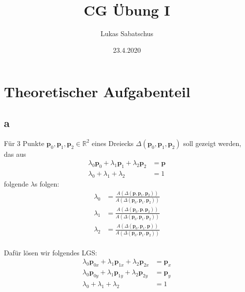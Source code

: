 \documentclass[fontsize=10pt,a4paper]{scrartcl}
\title{CG Übung I}
\author{Lukas Sabatschus}
\date{23.4.2020}
\begin{document}
\maketitle

\section{Theoretischer Aufgabenteil}
\subsection{a}
Für 3 Punkte $\mathbf{p}_0,\mathbf{p}_1,\mathbf{p}_2\in \mathbb{R}^2$
eines Dreiecks $\Delta(\mathbf{p}_0,\mathbf{p}_1,\mathbf{p}_2)$
soll gezeigt werden, das aus
\begin{align*}
	\lambda_0\mathbf{p}_0+\lambda_1\mathbf{p}_1+\lambda_2\mathbf{p}_2&=\mathbf{p}\\
	\lambda_0+\lambda_1+\lambda_2&=1
\end{align*}
folgende $\lambda$s folgen:
\begin{align*}
	\lambda_0 & =\frac{A(\Delta(\mathbf{p},\mathbf{p}_1,\mathbf{p}_2))}{A(\Delta(\mathbf{p}_0,\mathbf{p}_1,\mathbf{p}_2))} \\
	\lambda_1 & =\frac{A(\Delta(\mathbf{p}_0,\mathbf{p},\mathbf{p}_2))}{A(\Delta(\mathbf{p}_0,\mathbf{p}_1,\mathbf{p}_2))} \\
	\lambda_2 & =\frac{A(\Delta(\mathbf{p}_0,\mathbf{p}_1,\mathbf{p}))}{A(\Delta(\mathbf{p}_0,\mathbf{p}_1,\mathbf{p}_2))} \\
\end{align*}

Dafür lösen wir folgendes LGS:
\begin{align}
	\lambda_0\mathbf{p}_{0x}+\lambda_1\mathbf{p}_{1x}+\lambda_2\mathbf{p}_{2x}&=\mathbf{p}_x\\
	\lambda_0\mathbf{p}_{0y}+\lambda_1\mathbf{p}_{1y}+\lambda_2\mathbf{p}_{2y}&=\mathbf{p}_y\\
	\lambda_0+\lambda_1+\lambda_2&=1
\end{align}
\end{document}
